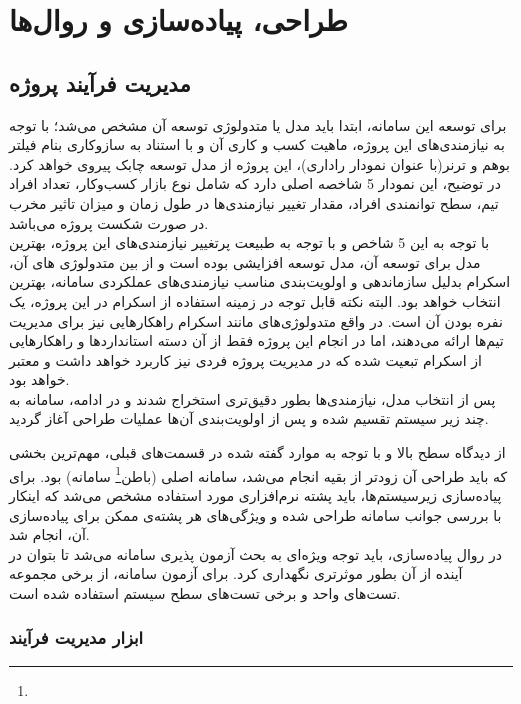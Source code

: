 \chapter{طراحی، پیاده‌سازی و روال‌ها}

\section{مدیریت فرآیند پروژه}

برای توسعه این سامانه، ابتدا باید مدل یا متدولوژی توسعه آن مشخص می‌شد؛ با توجه به نیازمندی‌های این پروژه، ماهیت کسب و کاری آن و با استناد به سازوکاری بنام فیلتر بوهم و ترنر(با عنوان نمودار راداری)، این پروژه از مدل توسعه چابک  پیروی خواهد کرد. در توضیح، این نمودار 5 شاخصه اصلی‌ دارد که شامل نوع بازار کسب‌وکار، تعداد افراد تیم، سطح توانمندی افراد، مقدار تغییر نیازمندی‌ها در طول زمان و میزان تاثیر مخرب در صورت شکست پروژه می‌باشد.\cite{reqeng}\\

 با توجه به این 5 شاخص و با توجه به طبیعت پرتغییر نیازمندی‌های این پروژه، بهترین مدل برای توسعه آن، مدل توسعه افزایشی  بوده است و از بین متدولوژی ‌های آن، اسکرام  بدلیل سازماندهی و اولویت‌بندی مناسب نیازمندی‌های عملکردی سامانه، بهترین انتخاب خواهد بود. البته نکته قابل توجه در زمینه استفاده از اسکرام در این پروژه، یک نفره بودن آن است. در واقع متدولوژی‌های مانند اسکرام راهکارهایی نیز برای مدیریت تیم‌ها ارائه می‌دهند، اما در انجام این پروژه فقط از آن دسته استانداردها و راهکارهایی از اسکرام تبعیت شده که در مدیریت پروژه فردی نیز کاربرد خواهد داشت و معتبر خواهد بود.\\
 
پس از انتخاب مدل، نیازمندی‌ها بطور دقیق‌تری استخراج شدند و در ادامه، سامانه به چند زیر سیستم تقسیم شده و پس از اولویت‌بندی آن‌ها عملیات طراحی آغاز گردید.

از دیدگاه سطح بالا و با توجه به موارد گفته شده در قسمت‌های قبلی، مهم‌ترین بخشی که باید طراحی آن زودتر از بقیه انجام می‌شد، سامانه اصلی (باطن\footnote{}  سامانه) بود. برای پیاده‌سازی زیرسیستم‌ها، باید پشته نرم‌افزاری مورد استفاده مشخص می‌شد که اینکار با بررسی جوانب سامانه طراحی شده و ویژگی‌های هر پشته‌ی ممکن برای پیاده‌سازی آن، انجام شد.\\

در روال پیاده‌سازی، باید توجه ویژه‌ای به بحث آزمون ‌پذیری سامانه می‌شد تا بتوان در آینده از آن بطور موثرتری نگهداری کرد. برای آزمون سامانه، از برخی مجموعه تست‌های واحد و برخی تست‌های سطح سیستم استفاده شده است.

\newpage

\subsection{ابزار مدیریت فرآیند}

